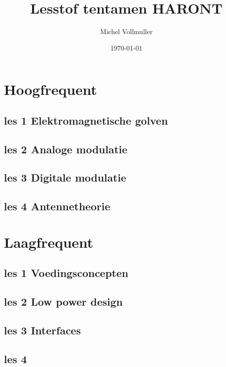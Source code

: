 \documentclass{article}
\begin{document}
\title{Lesstof tentamen HARONT}
\author{Michel Vollmuller}
\date{\today}

\maketitle


\tableofcontents

\newpage

\section{Hoogfrequent}

    \subsection{les 1 Elektromagnetische golven}
    

    \newpage
    \subsection{les 2 Analoge modulatie}
    

    \newpage
    \subsection{les 3 Digitale modulatie}
    

    \subsection{les 4 Antennetheorie}
    

\newpage

\section{Laagfrequent}

    \subsection{les 1 Voedingsconcepten}
    

    \subsection{les 2 Low power design}
    

    \subsection{les 3 Interfaces}
    

    \subsection{les 4}
    
\end{document}
